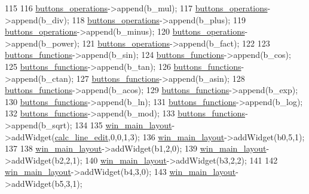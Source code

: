 \begin{DoxyCode}
115 
116     \hyperlink{classControl_adc925de7c9359450654d0ebf03304a07}{buttons\_operations}->append(b\_mul);
117     \hyperlink{classControl_adc925de7c9359450654d0ebf03304a07}{buttons\_operations}->append(b\_div);
118     \hyperlink{classControl_adc925de7c9359450654d0ebf03304a07}{buttons\_operations}->append(b\_plus);
119     \hyperlink{classControl_adc925de7c9359450654d0ebf03304a07}{buttons\_operations}->append(b\_minus);
120     \hyperlink{classControl_adc925de7c9359450654d0ebf03304a07}{buttons\_operations}->append(b\_power);
121     \hyperlink{classControl_adc925de7c9359450654d0ebf03304a07}{buttons\_operations}->append(b\_fact);
122 
123     \hyperlink{classControl_ada5bc6208e19fb16e73c0000164db11a}{buttons\_functions}->append(b\_sin);
124     \hyperlink{classControl_ada5bc6208e19fb16e73c0000164db11a}{buttons\_functions}->append(b\_cos);
125     \hyperlink{classControl_ada5bc6208e19fb16e73c0000164db11a}{buttons\_functions}->append(b\_tan);
126     \hyperlink{classControl_ada5bc6208e19fb16e73c0000164db11a}{buttons\_functions}->append(b\_ctan);
127     \hyperlink{classControl_ada5bc6208e19fb16e73c0000164db11a}{buttons\_functions}->append(b\_asin);
128     \hyperlink{classControl_ada5bc6208e19fb16e73c0000164db11a}{buttons\_functions}->append(b\_acos);
129     \hyperlink{classControl_ada5bc6208e19fb16e73c0000164db11a}{buttons\_functions}->append(b\_exp);
130     \hyperlink{classControl_ada5bc6208e19fb16e73c0000164db11a}{buttons\_functions}->append(b\_ln);
131     \hyperlink{classControl_ada5bc6208e19fb16e73c0000164db11a}{buttons\_functions}->append(b\_log);
132     \hyperlink{classControl_ada5bc6208e19fb16e73c0000164db11a}{buttons\_functions}->append(b\_mod);
133     \hyperlink{classControl_ada5bc6208e19fb16e73c0000164db11a}{buttons\_functions}->append(b\_sqrt);
134 
135     \hyperlink{classControl_ab3a44edbe7c336f435e0d0e8d2258e0d}{win\_main\_layout}->addWidget(\hyperlink{classControl_ae666eb91a7f9f964a07e779798cd18c8}{calc\_line\_edit},0,0,1,3);
136     \hyperlink{classControl_ab3a44edbe7c336f435e0d0e8d2258e0d}{win\_main\_layout}->addWidget(b0,5,1);
137 
138     \hyperlink{classControl_ab3a44edbe7c336f435e0d0e8d2258e0d}{win\_main\_layout}->addWidget(b1,2,0);
139     \hyperlink{classControl_ab3a44edbe7c336f435e0d0e8d2258e0d}{win\_main\_layout}->addWidget(b2,2,1);
140     \hyperlink{classControl_ab3a44edbe7c336f435e0d0e8d2258e0d}{win\_main\_layout}->addWidget(b3,2,2);
141 
142     \hyperlink{classControl_ab3a44edbe7c336f435e0d0e8d2258e0d}{win\_main\_layout}->addWidget(b4,3,0);
143     \hyperlink{classControl_ab3a44edbe7c336f435e0d0e8d2258e0d}{win\_main\_layout}->addWidget(b5,3,1);

\end{DoxyCode}
